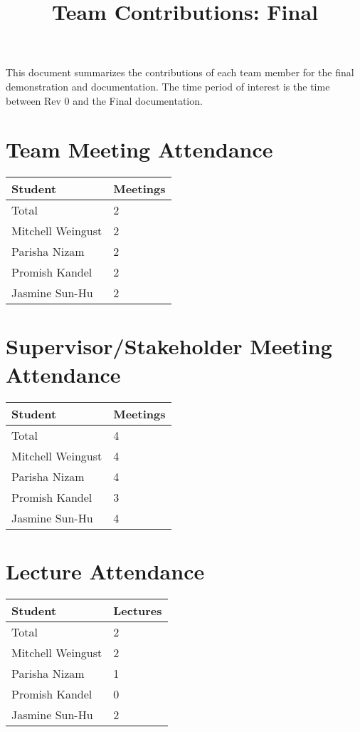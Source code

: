 \documentclass{article}
\title{Team Contributions: Final\\\progname}
\author{\authname}
\date{}
\begin{document}
\maketitle

This document summarizes the contributions of each team member for the final
demonstration and documentation.  The time period of interest is the time
between Rev 0 and the Final documentation.

\section{Team Meeting Attendance}

\begin{table}[H]
\centering
\begin{tabular}{ll}
\toprule
\textbf{Student} & \textbf{Meetings}\\
\midrule
Total & 2\\
Mitchell Weingust & 2\\
Parisha Nizam & 2\\
Promish Kandel & 2\\
Jasmine Sun-Hu & 2\\
\bottomrule
\end{tabular}
\end{table}

\section{Supervisor/Stakeholder Meeting Attendance}

\begin{table}[H]
\centering
\begin{tabular}{ll}
\toprule
\textbf{Student} & \textbf{Meetings}\\
\midrule
Total & 4\\
Mitchell Weingust & 4\\
Parisha Nizam & 4\\
Promish Kandel & 3\\
Jasmine Sun-Hu & 4\\
\bottomrule
\end{tabular}
\end{table}

\section{Lecture Attendance}

\begin{table}[H]
\centering
\begin{tabular}{ll}
\toprule
\textbf{Student} & \textbf{Lectures}\\
\midrule
Total & 2\\
Mitchell Weingust & 2\\
Parisha Nizam & 1\\
Promish Kandel & 0\\
Jasmine Sun-Hu & 2\\
\bottomrule
\end{tabular}
\end{table}
\end{document}
